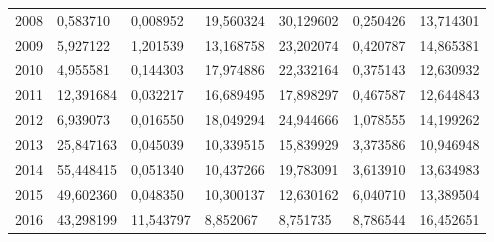 \begin{table}
\begin{tabular}{p{1cm}p{2cm}p{2cm}p{2cm}p{2cm}p{2cm}p{2cm}}
 2008 &                         0,583710 &                        0,008952 &                                    19,560324 &              30,129602 &                                      0,250426 &                                    13,714301 \\
 2009 &                         5,927122 &                        1,201539 &                                    13,168758 &              23,202074 &                                      0,420787 &                                    14,865381 \\
 2010 &                         4,955581 &                        0,144303 &                                    17,974886 &              22,332164 &                                      0,375143 &                                    12,630932 \\
 2011 &                        12,391684 &                        0,032217 &                                    16,689495 &              17,898297 &                                      0,467587 &                                    12,644843 \\
 2012 &                         6,939073 &                        0,016550 &                                    18,049294 &              24,944666 &                                      1,078555 &                                    14,199262 \\
 2013 &                        25,847163 &                        0,045039 &                                    10,339515 &              15,839929 &                                      3,373586 &                                    10,946948 \\
 2014 &                        55,448415 &                        0,051340 &                                    10,437266 &              19,783091 &                                      3,613910 &                                    13,634983 \\
 2015 &                        49,602360 &                        0,048350 &                                    10,300137 &              12,630162 &                                      6,040710 &                                    13,389504 \\
 2016 &                        43,298199 &                       11,543797 &                                     8,852067 &               8,751735 &                                      8,786544 &                                    16,452651 \\
\bottomrule
\end{tabular}
\end{table}
